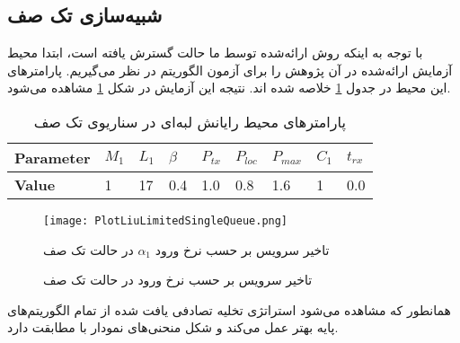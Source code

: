 \subsection{شبیه‌سازی تک صف}
با توجه به اینکه روش ارائه‌شده توسط ما حالت گسترش یافته \cite{Liu} است، ابتدا محیط آزمایش ارائه‌شده در آن پژوهش را برای آزمون الگوریتم در نظر می‌گیریم. پارامترهای این محیط در جدول \ref{table:parameters-singlequeue} خلاصه شده اند. نتیجه این آزمایش در شکل \ref{plot:singleQueue} مشاهده می‌شود.

\begin{table}
	\centering
	\begin{latin}
		\begin{tabular}{@{}lllllllll@{}}
			\toprule
			\textbf{Parameter} & $M_1$ & $L_1$ & $\beta$ & $P_{tx}$ & $P_{loc}$ & $P_{max}$ & $C_1$ & $t_{rx}$ \\ \midrule
			\textbf{Value}             & 1    & 17   & 0.4  & 1.0 & 0.8  & 1.6  & 1    & 0.0   \\ \bottomrule
		\end{tabular}
	\end{latin}
	\caption{پارامترهای محیط رایانش لبه‌ای در سناریوی تک صف}
	\label{table:parameters-singlequeue}
\end{table}

\begin{figure}
	\centering
	\texttt{[image: PlotLiuLimitedSingleQueue.png]}
	\caption{تاخیر سرویس بر حسب نرخ ورود در حالت تک صف}{تاخیر سرویس بر حسب نرخ ورود $\alpha_1$ در حالت تک صف}
	\label{plot:singleQueue}
\end{figure}
همانطور که مشاهده می‌شود استراتژی تخلیه تصادفی یافت شده از تمام الگوریتم‌های پایه بهتر عمل می‌کند و شکل منحنی‌های نمودار با \cite{Liu} مطابقت دارد.
